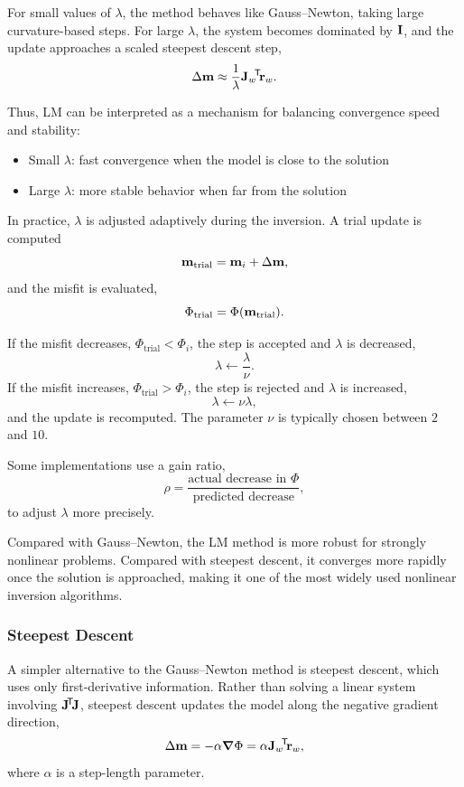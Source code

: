 For small values of $\lambda$, the method behaves like Gauss--Newton, taking large curvature-based steps. For large $\lambda$, the system becomes dominated by $\vb{I}$, and the update approaches a scaled steepest descent step,
\[
    \Delta \vb{m} \approx \frac{1}{\lambda} \vb{J}_w\!^\mathsf{T}\! \vb{r}_w.
\]

Thus, LM can be interpreted as a mechanism for balancing convergence speed and stability:
\begin{itemize}
    \item Small $\lambda$: fast convergence when the model is close to the solution
    \item Large $\lambda$: more stable behavior when far from the solution
\end{itemize}

In practice, $\lambda$ is adjusted adaptively during the inversion. A trial update is computed
\[
    \vb{m}_{\text{trial}} = \vb{m}_i + \Delta \vb{m},
\]
and the misfit is evaluated,
\[
    \Phi_{\text{trial}} = \Phi(\vb{m}_{\text{trial}}).
\]

If the misfit decreases, $\Phi_{\text{trial}} < \Phi_i$, the step is accepted and $\lambda$ is decreased,
\[
    \lambda \leftarrow \frac{\lambda}{\nu}.
\]
If the misfit increases, $\Phi_{\text{trial}} > \Phi_i$, the step is rejected and $\lambda$ is increased,
\[
    \lambda \leftarrow \nu \lambda,
\]
and the update is recomputed. The parameter $\nu$ is typically chosen between $2$ and $10$.

Some implementations use a gain ratio,
\[
    \rho = \frac{\text{actual decrease in }\Phi}{\text{predicted decrease}},
\]
to adjust $\lambda$ more precisely.

Compared with Gauss--Newton, the LM method is more robust for strongly nonlinear problems. Compared with steepest descent, it converges more rapidly once the solution is approached, making it one of the most widely used nonlinear inversion algorithms.

\subsubsection{Steepest Descent}

A simpler alternative to the Gauss--Newton method is steepest descent, which uses only first-derivative information. Rather than solving a linear system involving $\vb{J}\!^\mathsf{T}\! \vb{J}$, steepest descent updates the model along the negative gradient direction,
\[
    \Delta \vb{m} = -\alpha \grad \Phi = \alpha \vb{J}_w\!^\mathsf{T}\! \vb{r}_w,
\]
where $\alpha$ is a step-length parameter.

